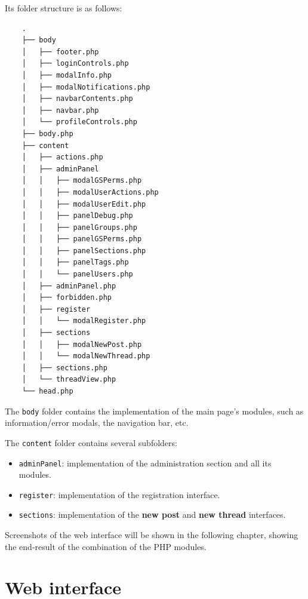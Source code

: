\documentclass[12pt]{report}
\renewcommand\emph{\textbf}
\begin{document}
                Its folder structure is as follows:

                \begin{verbatim}
    .
    ├── body
    │   ├── footer.php
    │   ├── loginControls.php
    │   ├── modalInfo.php
    │   ├── modalNotifications.php
    │   ├── navbarContents.php
    │   ├── navbar.php
    │   └── profileControls.php
    ├── body.php
    ├── content
    │   ├── actions.php
    │   ├── adminPanel
    │   │   ├── modalGSPerms.php
    │   │   ├── modalUserActions.php
    │   │   ├── modalUserEdit.php
    │   │   ├── panelDebug.php
    │   │   ├── panelGroups.php
    │   │   ├── panelGSPerms.php
    │   │   ├── panelSections.php
    │   │   ├── panelTags.php
    │   │   └── panelUsers.php
    │   ├── adminPanel.php
    │   ├── forbidden.php
    │   ├── register
    │   │   └── modalRegister.php
    │   ├── sections
    │   │   ├── modalNewPost.php
    │   │   └── modalNewThread.php
    │   ├── sections.php
    │   └── threadView.php
    └── head.php
                \end{verbatim}

                The \texttt{body} folder contains the implementation of the main page's modules, such as information/error modals, the navigation bar, etc.

                The \texttt{content} folder contains several subfolders:

                \begin{itemize}
                    \item \texttt{adminPanel}: implementation of the administration section and all its modules.
                    \item \texttt{register}: implementation of the registration interface.
                    \item \texttt{sections}: implementation of the \emph{new post} and \emph{new thread} interfaces.
                \end{itemize}

                Screenshots of the web interface will be shown in the following chapter, showing the end-result of the combination of the PHP modules.

        \chapter{Web interface}
            
\end{document}
